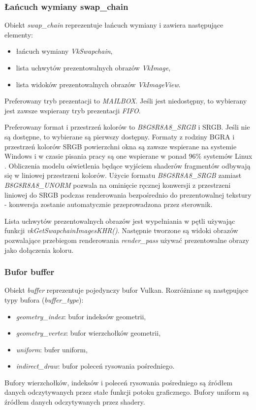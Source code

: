 \subsubsection{Łańcuch wymiany swap\_chain}
Obiekt \textit{swap\_chain} reprezentuje łańcuch wymiany i zawiera następujące elementy:
\begin{itemize}
	\item łańcuch wymiany \textit{VkSwapchain},
	\item lista uchwytów prezentowalnych obrazów \textit{VkImage},
	\item lista widoków prezentowalnych obrazów \textit{VkImageView}.
\end{itemize}

Preferowany tryb prezentacji to \textit{MAILBOX}. Jeśli jest niedostępny, to wybierany jest zawsze wspierany tryb prezentacji \textit{FIFO}.

Preferowany format i przestrzeń kolorów to \textit{B8G8R8A8\_SRGB} i SRGB. Jeśli nie są dostępne, to wybierane są pierwszy dostępny.
Formaty z rodziny BGRA i przestrzeń kolorów SRGB powierzchni okna są zawsze wspierane na systemie Windows i w czasie pisania pracy są one wspierane w ponad $96\%$ systemów Linux \cite{GPUINFO}.
Obliczenia modelu oświetlenia będące wyjściem shaderów fragmentów odbywają się w liniowej przestrzeni kolorów. Użycie formatu \textit{B8G8R8A8\_SRGB} zamiast \textit{B8G8R8A8\_UNORM} pozwala na ominięcie ręcznej konwersji z przestrzeni liniowej do SRGB podczas renderowania bezpośrednio do prezentowalnej tekstury - konwersja zostanie automatycznie przeprowadzona przez sterownik.

Lista uchwytów prezentowalnych obrazów jest wypełniania w pętli używając funkcji \textit{vkGetSwapchainImagesKHR()}.
Następnie tworzone są widoki obrazów pozwalające przebiegom renderowania \textit{render\_pass} używać prezentowalne obrazy jako dołączenia koloru.


\subsubsection{Bufor buffer}
Obiekt \textit{buffer} reprezentuje pojedynczy bufor Vulkan.
Rozróżniane są następujące typy bufora (\textit{buffer\_type}):
\begin{itemize}
	\item \textit{geometry\_index}: bufor indeksów geometrii,
	\item \textit{geometry\_vertex}: bufor wierzchołków geometrii,
	\item \textit{uniform}: bufer uniform,
	\item \textit{indirect\_draw}: bufor poleceń rysowania pośredniego.
\end{itemize}
Bufory wierzchołków, indeksów i poleceń rysowania pośredniego są źródłem danych odczytywanych przez stałe funkcji potoku graficznego.
Bufory uniform są źródłem danych odczytywanych przez shadery.

